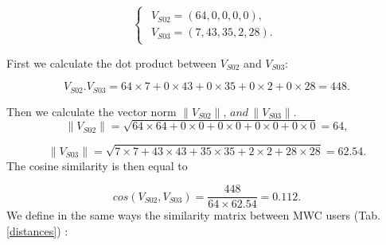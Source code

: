\[
\begin{cases}
\begin{array}{c}
V_{S02}=(64,0,0,0,0),\\
V_{S03}=(7,43,35,2,28).
\end{array}
\end{cases}
\]

First we calculate the dot product between $V_{S02}$ and $V_{S03}$:

\[
V_{S02}. V_{S03}=64\times7+0\times43+0\times35+0\times2+0\times28=448.
\]

Then we calculate the vector norm $\parallel V_{S02}\parallel,\,and\,\parallel V_{S03}\parallel$.
\[
\parallel V_{S02} \parallel =\sqrt{64\times64+0\times0+0\times0+0\times0+0\times0}=64,
\]

\[
\parallel V_{S03} \parallel =\sqrt{7\times7+43\times43+35\times35+2\times2+28\times28}=62.54.
\]
The cosine similarity is then equal to 

\[
cos(V_{S02},V_{S03})=\frac{448}{64\times62.54}=0.112.
\]
We define in the same ways the similarity matrix between MWC users (Tab. \ref{distances}) : 

